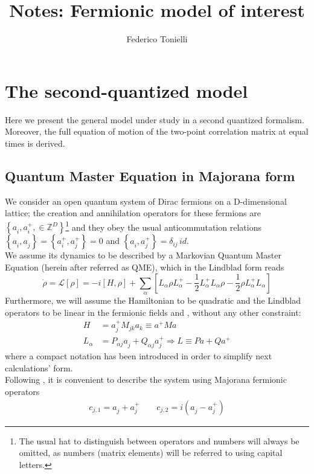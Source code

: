 \documentclass[a4paper,11pt]{article}
\title{Notes: Fermionic model of interest}
\author{Federico Tonielli}
\newcommand\blankpage{%
    \null
    \thispagestyle{empty}%
    \addtocounter{page}{-1}%
    \newpage}
\newcommand{\ro}{\rho}
\begin{document}
 \maketitle
 
 \tableofcontents
 \blankpage
 
 \section{The second-quantized model}
 Here we present the general model under study in a second quantized formalism.  Moreover, the full equation of motion of the two-point correlation matrix at equal times is derived.
 
  \subsection{Quantum Master Equation in Majorana form}
   We consider an open quantum system of Dirac fermions on a D-dimensional lattice; the creation and annihilation operators for these fermions are $\left \{ a_i^{ },a_i^+, \in \mathbb{Z}^D \right \} $\footnote{ The usual hat to distinguish between operators and numbers will always be omitted, as numbers (matrix elements) will be referred to using capital letters.} and they obey the usual anticommutation relations $\left\{a_i^{ },a_j^{ }\right\} = \left\{a_i^{+},a_j^+\right \}=0$ and $\left\{a_i^{ },a_j^+\right \} = \delta_{ij}\,id $.\\  We assume its dynamics to be described by a Markovian Quantum Master Equation (herein after referred as QME), which in the Lindblad form reads
  \[\dot{\ro}=\mathcal{L}[\ro]=-i\left[H,\ro\right]+\sum_{\alpha}\left[L_{\alpha}^{ }\ro L_{\alpha}^+ - \frac{1}{2}L_{\alpha}^+L_{\alpha}^{ }\ro - \frac{1}{2}\ro L_{\alpha}^+L_{\alpha}^{ }\right]  \]
  Furthermore, we will assume the Hamiltonian to be quadratic and the Lindblad operators to be linear in the fermionic fields  and , without any other constraint: 
  \begin{subequations}
  \renewcommand{\theequation}{\theparentequation.\arabic{equation}}
  \begin{align}
   H & = a_j^+M_{jk}a_k^{ } \equiv a^+Ma \\ 
   L_{\alpha} & = P^{ }_{\alpha j}a_j^{ } + Q^{ }_{\alpha j}a_j^+ \Rightarrow L \equiv P a + Q a^+
   \label{eq:quadr_dyn}
  \end{align}
  \end{subequations}
 where a compact notation has been introduced in order to simplify next calculations' form. \\
 Following \cite{Eisert2010}, it is convenient to describe the system using Majorana fermionic operators
 \begin{align}
  c_{j,1}=a_j^{ }+a_j^{+} \quad \quad c_{j,2} = i\left(a_j^{ }-a_j^{+}\right)
 \end{align}
\end{document}
